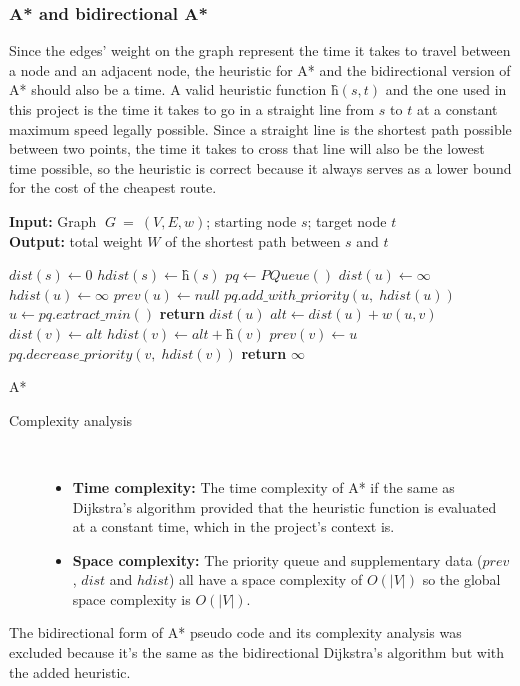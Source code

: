 \documentclass{article}
\begin{document}
\subsubsection{A* and bidirectional A*}
Since the edges' weight on the graph represent the time it takes to travel between a node and an adjacent node, the heuristic for A* and the bidirectional version of A* should also be a time. A valid heuristic function $ĥ(s,t)$ and the one used in this project is the time it takes to go in a straight line from $s$ to $t$ at a constant maximum speed legally possible. Since a straight line is the shortest path possible between two points, the time it takes to cross that line will also be the lowest time possible, so the heuristic is correct because it always serves as a lower bound for the cost of the cheapest route.
\begin{algorithm}
\textbf{Input:} Graph $\;G\:=\:(V, E, w)$; starting node $s$; target node $t$\\
\textbf{Output:} total weight $W$ of the shortest path between $s$ and $t$
\begin{algorithmic}[1]
        \State $dist(s) \gets 0$
        \State $hdist(s) \gets ĥ(s)$
        \State $pq \gets PQueue()$
                \State $dist(u) \gets \infty$
                \State $hdist(u) \gets \infty$
                \State $prev(u) \gets null$
            \EndIf
            \State $pq.add\_with\_priority(u,\;hdist(u))$
        \EndFor
            \State $u \gets pq.extract\_min()$
                \State \textbf{return} $dist(u)$
            \EndIf
                \State $alt \gets dist(u)+w(u,v)$
                    \State $dist(v)\gets alt$
                    \State $hdist(v)\gets alt+ĥ(v)$
                    \State $prev(v)\gets u$
                    \State $pq.decrease\_priority(v,\;hdist(v))$
                \EndIf
            \EndFor
        \EndWhile
        \State \textbf{return} $\infty$
    \EndFunction
\end{algorithmic}
\caption{A*}
\end{algorithm}
\begin{description}
\item[Complexity analysis]\
\begin{itemize}
    \item \textbf{Time complexity:} The time complexity of A* if the same as Dijkstra’s algorithm provided that the heuristic function is evaluated at a constant time, which in the project's context is.
    \item \textbf{Space complexity:} The priority queue and supplementary data ($prev$, $dist$ and $hdist$) all have a space complexity of $O(|V|)$ so the global space complexity is $O(|V|)$.
\end{itemize}
\end{description}
The bidirectional form of A* pseudo code and its complexity analysis was excluded because it's the same as the bidirectional Dijkstra's algorithm but with the added heuristic.
\newpage
\end{document}

